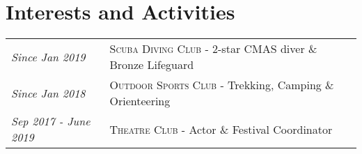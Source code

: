 \documentclass[a4paper,10pt]{article} %
\begin{document}



\section{Interests and Activities}
\begin{longtable}{l|l}
\emph{Since Jan 2019} & \textsc{Scuba Diving Club} - 2-star CMAS diver \& Bronze Lifeguard\\
\emph{Since Jan 2018} & \textsc{Outdoor Sports Club} - Trekking, Camping \& Orienteering\\
\emph{Sep 2017 - June 2019} & \textsc{Theatre Club} - Actor \& Festival Coordinator
\end{longtable}


\end{document}

